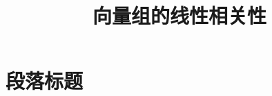 \documentclass[UTF8]{ctexart}
\title{向量组的线性相关性}
\begin{document}
\tableofcontents %
\date{} %
\maketitle  %

\section{段落标题}
\end{document}
